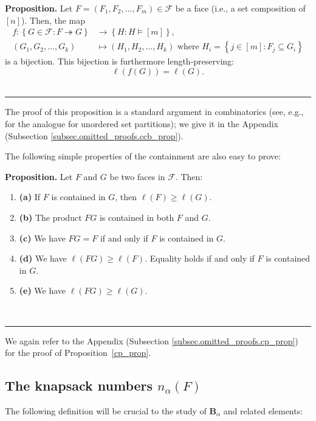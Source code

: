 \documentclass[12pt]{article}
\theoremstyle{definition}%
\newtheorem{prop}[thm]{Proposition}
\theoremstyle{definition}%
\theoremstyle{remark}%
\newcommand{\tup}[1]{\left( #1 \right)}
\newcommand{\interval}[1]{\left[ #1 \right]} %
\newcommand{\set}[1]{\left\{ #1 \right\}}
\newcommand{\BBa}{\mathbf{B}_{\alpha}}
\newcommand{\CF}{\mathcal{F}}
\newcommand{\na}{n_{ \alpha } }%
\newcommand{\con}{\twoheadrightarrow} %
\newenvironment{prop}[1][Proposition]{\noindent\textbf{#1.} }{\ \rule{0.5em}{0.5em}}
\begin{document}
\begin{prop}
    \label{ccb_prop}
     Let $F = \tup{F_1, F_2, \ldots, F_m} \in \CF$ be a face (i.e., a set composition of $\interval{n}$). Then, the map
     \begin{align*}
        f : \set{G \in \CF : F \con G} &\to \set{H : H\models \interval{m}}, \\
        \tup{G_1, G_2, \ldots, G_k} &\mapsto \tup{H_1, H_2, \ldots, H_k} \text{ where } H_{i} = \set{j \in \interval{m} : F_{j} \subseteq G_{i}}
    \end{align*}
    is a bijection. This bijection is furthermore length-preserving:
    \[
    \ell \tup{f\tup{G}} = \ell \tup{G}.
    \]
\end{prop}
The proof of this proposition is a standard argument in combinatorics (see, e.g., \cite[Example 3.10.4]{EC1} for the analogue for unordered set partitions); we give it in the Appendix (Subsection \ref{subsec.omitted_proofs.ccb_prop}).

The following simple properties of the containment are also easy to prove:

\begin{prop}
    \label{cp_prop}
    Let $F$ and $G$ be two faces in $\CF$. Then:
    \begin{enumerate}[]
        \item\textbf{(a)} If $F$ is contained in $G$, then $\ell \tup{F} \ge \ell \tup{G}$.
        \item\textbf{(b)} The product $FG$ is contained in both $F$ and $G$.
        \item\textbf{(c)} We have $FG = F$ if and only if $F$ is contained in $G$.
        \item\textbf{(d)} We have $\ell \tup{FG} \ge \ell \tup{F}$. Equality holds if and only if $F$ is contained in $G$.
        \item\textbf{(e)} We have $\ell \tup{FG} \ge \ell \tup{G}$.
    \end{enumerate}
\end{prop}

We again refer to the Appendix (Subsection \ref{subsec.omitted_proofs.cp_prop}) for the proof of Proposition~\ref{cp_prop}.

\subsection{The knapsack numbers $ \na\tup{F} $}

The following definition will be crucial to the study of $\BBa$ and related elements:
\end{document}
